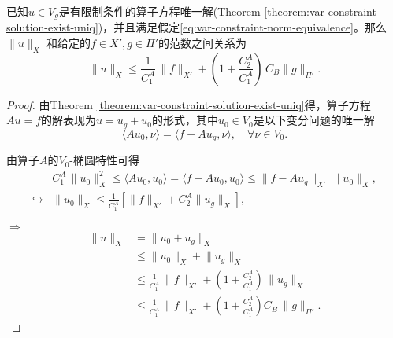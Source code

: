 \begin{corollary}
  \label{corollary:var-constraint-norm-equivalence}
  已知$u \in V_g$是有限制条件的算子方程唯一解(Theorem \ref{theorem:var-constraint-solution-exist-uniq})，并且满足假定\eqref{eq:var-constraint-norm-equivalence}。那么$\| u \|_{X}$
  和给定的$f \in X', g\in \Pi'$的范数之间关系为
  \begin{equation*}
    \big\| u \big\|_{X} \le \frac{1}{C_1^A} \, \big\| f \big\|_{X'} + \left(
    1+ \frac{
    C_2^A
    }{
    C_1^A
    }
    \right)
    \, C_B \big\| g \big\|_{\Pi'}.
  \end{equation*}
\end{corollary}
\begin{proof}
  由Theorem \ref{theorem:var-constraint-solution-exist-uniq}得，算子方程$Au = f$的解表现为$u = u_g + u_0$的形式，其中$u_0 \in V_0$是以下变分问题的唯一解
  \begin{equation*}
    \langle A u_0, \nu \rangle = \langle f - A u_g, \nu \rangle, \quad \forall \nu \in V_0.
  \end{equation*}

  由算子$A$的$V_0$-椭圆特性可得
  \begin{equation*}
    \begin{split}
      &C_1^A \, \big\|u_0\big\|_{X}^2 \le \langle A u_0, u_0 \rangle =
      \langle f - A u_0, u_0 \rangle
      \le \big\| f - A u_g \big\|_{X'} \, \big\|u_0 \big\|_{X},\\
      \hookrightarrow & \big\| u_0 \big\|_{X} \le \frac{1}{C_1^A}
      \left[
      \big\| f \big\|_{X'} + C_2^A \big\| u_g \big\|_X
      \right],
    \end{split}
  \end{equation*}

$\Rightarrow$
  \begin{equation*}
    \begin{split}
      \big\| u \big\|_X & = \big\| u_0 + u_g \big\|_X \\
      &\le  \big\| u_0 \big\|_X + \big\| u_g \big\|_X \\
      & \le \frac{1}{C_1^A} \, \big\| f \big\|_{X'} +
      \left( 1 + \frac{C_2^A}{C_1^A} \right) \, \big\| u_g \big\|_{X} \\
      & \le \frac{1}{C_1^A} \, \big\| f \big\|_{X'} +
      \left( 1 + \frac{C_2^A}{C_1^A} \right) C_B \, \big\| g \big\|_{\Pi'}.
    \end{split}
  \end{equation*}
\end{proof}

